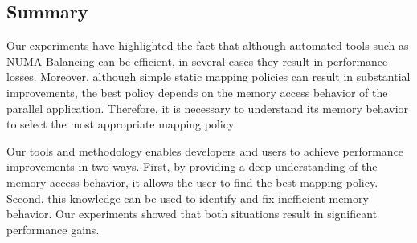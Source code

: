 \subsection{Summary}

Our experiments have highlighted the fact that although automated tools such
as NUMA Balancing can be efficient, in several cases they result in
performance losses. Moreover, although simple static mapping policies
can result in substantial improvements, the best policy depends on the memory access behavior of the parallel application. Therefore, it is necessary to understand its memory behavior to
select the most appropriate mapping policy.

Our tools and methodology enables developers and users to achieve performance improvements in two ways. First, by
providing a deep understanding of the memory access behavior, it allows the user to
find the best mapping policy. Second, this knowledge can be used to
identify and fix inefficient memory behavior. Our experiments showed that both
situations result in significant performance gains.
